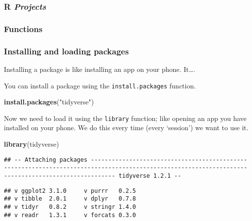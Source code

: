 \documentclass[]{tufte-handout}
\newenvironment{Shaded}{}{}
\newcommand{\KeywordTok}[1]{\textcolor[rgb]{0.00,0.44,0.13}{\textbf{#1}}}
\newcommand{\NormalTok}[1]{#1}
\newcommand{\StringTok}[1]{\textcolor[rgb]{0.25,0.44,0.63}{#1}}
\begin{document}
\hypertarget{r-projects}{%
\subsubsection{\texorpdfstring{R
\emph{Projects}}{R Projects}}\label{r-projects}}

\hypertarget{functions}{%
\subsubsection{Functions}\label{functions}}

\hypertarget{installing-and-loading-packages}{%
\subsubsection{Installing and loading
packages}\label{installing-and-loading-packages}}

Installing a package is like installing an app on your phone.
It\ldots{}.

You can install a package using the \texttt{install.packages} function.

\begin{Shaded}
\begin{Highlighting}[]
\KeywordTok{install.packages}\NormalTok{(}\StringTok{"tidyverse"}\NormalTok{)}
\end{Highlighting}
\end{Shaded}

Now we need to load it using the \texttt{library} function; like opening
an app you have installed on your phone. We do this every time (every
`session') we want to use it.

\begin{Shaded}
\begin{Highlighting}[]
\KeywordTok{library}\NormalTok{(tidyverse)}
\end{Highlighting}
\end{Shaded}

\begin{verbatim}
## -- Attaching packages --------------------------------------------------------------------------------------------------------------------------------------------------- tidyverse 1.2.1 --
\end{verbatim}

\begin{verbatim}
## v ggplot2 3.1.0     v purrr   0.2.5
## v tibble  2.0.1     v dplyr   0.7.8
## v tidyr   0.8.2     v stringr 1.4.0
## v readr   1.3.1     v forcats 0.3.0
\end{verbatim}
\end{document}
